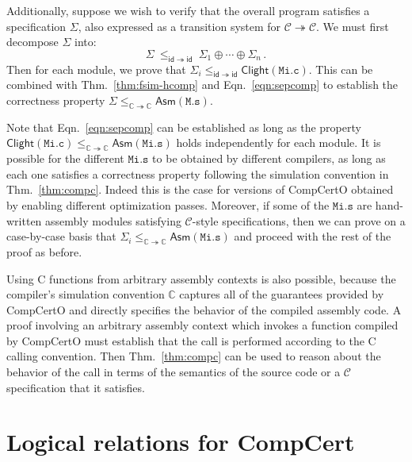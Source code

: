 \documentclass[acmsmall,screen,review,anonymous]{acmart}
\newcommand{\kw}[1]{\ensuremath{ \mathsf{#1} }}
\begin{document}
Additionally,
suppose we wish to verify that the overall program
satisfies a specification $\Sigma$,
also expressed as a transition system
for $\mathcal{C} \twoheadrightarrow \mathcal{C}$.
We must first decompose $\Sigma$
into:
\[
    \Sigma \: \le_{\kw{id} \twoheadrightarrow \kw{id}} \:
    \Sigma_1 \oplus \cdots \oplus \Sigma_n \,.
\]
Then for each module, we prove that
$\Sigma_i \le_{\kw{id} \twoheadrightarrow \kw{id}} \kw{Clight}(\mathtt{Mi.c})$.
This can be combined with Thm.~\ref{thm:fsim-hcomp} and Eqn.~\ref{eqn:sepcomp}
to establish the correctness property
$\Sigma \le_{\mathbb{C} \twoheadrightarrow \mathbb{C}}
        \kw{Asm}(\mathtt{M.s})$.

Note that Eqn.~\ref{eqn:sepcomp} can be established
as long as the property
$\kw{Clight}(\mathtt{Mi.c})
 \le_{\mathbb{C} \twoheadrightarrow \mathbb{C}}
 \kw{Asm}(\mathtt{Mi.s})$
holds independently for each module.
It is possible for the different $\mathtt{Mi.s}$
to be obtained by different compilers,
as long as each one satisfies a correctness property
following the simulation convention in Thm.~\ref{thm:compc}.
Indeed this is the case for versions of CompCertO
obtained by enabling different optimization passes.
Moreover, if some of the $\mathtt{Mi.s}$
are hand-written assembly modules satisfying
$\mathcal{C}$-style specifications,
then we can prove on a case-by-case basis that
$\Sigma_i \le_{\mathbb{C} \twoheadrightarrow \mathbb{C}} \kw{Asm}(\mathtt{Mi.s})$
and proceed with the rest of the proof as before.

Using C functions from
arbitrary assembly contexts is also possible,
because the compiler's simulation convention $\mathbb{C}$
captures all of the guarantees provided by CompCertO and
directly specifies the behavior of the compiled assembly code.
A proof involving an arbitrary assembly context
which invokes a function compiled by CompCertO
must establish that the call is performed
according to the C calling convention.
Then Thm.~\ref{thm:compc}
can be used to reason about the behavior of the call
in terms of the semantics of the source code
or a $\mathcal{C}$ specification that it satisfies.



\section{Logical relations for CompCert} \label{sec:cklr} %
\end{document}
